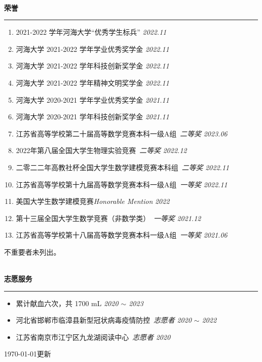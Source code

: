 \documentclass[12pt]{article}
\newcommand{\sect}[1]{
    ~\\ \noindent \textbf{#1} \medskip \hrule \medskip
}
\begin{document}

\sect{荣誉}

\begin{enumerate}
    \item 2021-2022 学年河海大学“优秀学生标兵” \hfill \textit{2022.11}
    \item 河海大学 2021-2022 学年学业优秀奖学金 \hfill \textit{2022.11}
    \item 河海大学 2021-2022 学年科技创新奖学金 \hfill \textit{2022.11}
    \item 河海大学 2021-2022 学年精神文明奖学金 \hfill \textit{2022.11}
    \item 河海大学 2020-2021 学年学业优秀奖学金 \hfill \textit{2021.11}
    \item 河海大学 2020-2021 学年科技创新奖学金 \hfill \textit{2021.11}
          \\
    \item 江苏省高等学校第二十届高等数学竞赛本科一级A组\ \textit{二等奖} \hfill \textit{2023.06}
    \item 2022年第八届全国大学生物理实验竞赛\ \textit{二等奖}  \hfill \textit{2022.12}
    \item 二零二二年高教社杯全国大学生数学建模竞赛本科组\ \textit{二等奖} \hfill \textit{2022.11}
    \item 江苏省高等学校第十九届高等数学竞赛本科一级A组\ \textit{一等奖} \hfill \textit{2022.11}
    \item 美国大学生数学建模竞赛\textit{Honorable Mention} \hfill \textit{2022}
    \item 第十三届全国大学生数学竞赛（非数学类）\ \textit{一等奖} \hfill \textit{2021.12}
    \item 江苏省高等学校第十八届高等数学竞赛本科一级A组\ \textit{一等奖} \hfill \textit{2021.06}
\end{enumerate}

\hfill {\tiny 不重要者未列出。}


\sect{志愿服务}

\begin{itemize}[noitemsep,nolistsep]
    \item 累计献血六次，共 1700 mL \hfill \textit{2020 $\sim$ 2023}
    \item 河北省邯郸市临漳县新型冠状病毒疫情防控\ \textit{志愿者} \hfill \textit{2020 $\sim$ 2022}
    \item 江苏省南京市江宁区九龙湖阅读中心\ \textit{志愿者} \hfill \textit{2020}
\end{itemize}

\hfill {\tiny \today 更新}
\end{document}
